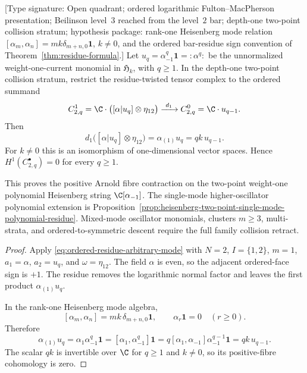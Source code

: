 \begin{proposition}
\label{prop:heisenberg-two-point-weight-one-polynomial-residue}
\textup{[Type signature: Open quadrant; ordered logarithmic
Fulton--MacPherson presentation; Beilinson level~$3$ reached from the
level~$2$ bar; depth-one two-point collision stratum; hypothesis
package: rank-one Heisenberg mode relation
\([\alpha_m,\alpha_n]=mk\delta_{m+n,0}\mathbf1\), \(k\neq0\), and the
ordered bar-residue sign convention of
Theorem~\ref{thm:residue-formula}.]}
Let \(u_q=\alpha_{-1}^{q}\mathbf1=:\!\alpha^q\!:\) be the
unnormalized weight-one-current monomial in \(\mathfrak H_k\), with
\(q\geq1\).  In the depth-one two-point collision stratum, restrict the
residue-twisted tensor complex to the ordered summand
\[
 C^1_{2,q}
 =
 \C\cdot\bigl([\alpha|u_q]\otimes\eta_{12}\bigr)
 \xrightarrow{\ d_1\ }
 C^0_{2,q}
 =
 \C\cdot u_{q-1}.
\]
Then
\[
 d_1\bigl([\alpha|u_q]\otimes\eta_{12}\bigr)
 =
 \alpha_{(1)}u_q
 =
 qk\,u_{q-1}.
\]
For \(k\neq0\) this is an isomorphism of one-dimensional vector
spaces.  Hence \(H^1(C^\bullet_{2,q})=0\) for every \(q\geq1\).

This proves the positive Arnold fibre contraction on the two-point
weight-one polynomial Heisenberg string \(\C[\alpha_{-1}]\).  The
single-mode higher-oscillator polynomial extension is
Proposition~\ref{prop:heisenberg-two-point-single-mode-polynomial-residue}.
Mixed-mode oscillator monomials, clusters \(m\geq3\), multi-strata,
and ordered-to-symmetric descent require the full family collision
retract.
\end{proposition}

\begin{proof}
Apply \eqref{eq:ordered-residue-arbitrary-mode} with \(N=2\),
\(I=\{1,2\}\), \(m=1\), \(a_1=\alpha\), \(a_2=u_q\), and
\(\omega=\eta_{12}\).  The field \(\alpha\) is even, so the adjacent
ordered-face sign is \(+1\).  The residue removes the logarithmic
normal factor and leaves the first product \(\alpha_{(1)}u_q\).

In the rank-one Heisenberg mode algebra,
\[
 [\alpha_m,\alpha_n]=mk\,\delta_{m+n,0}\mathbf1,
 \qquad
 \alpha_r\mathbf1=0\quad(r\geq0).
\]
Therefore
\[
 \alpha_{(1)}u_q
 =
 \alpha_1\alpha_{-1}^{q}\mathbf1
 =
 [\alpha_1,\alpha_{-1}^{q}]\mathbf1
 =
 q[\alpha_1,\alpha_{-1}]\alpha_{-1}^{q-1}\mathbf1
 =
 qk\,u_{q-1}.
\]
The scalar \(qk\) is invertible over \(\C\) for \(q\geq1\) and
\(k\neq0\), so its positive-fibre cohomology is zero.
\end{proof}


